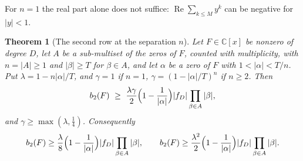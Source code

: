 \documentclass[11pt]{article}
\newtheorem{theorem}{Theorem}[section]
\begin{document}
For $n=1$ the real part alone does not suffice: $\operatorname{Re}\sum_{k\le M}y^k$
can be negative for $|y|<1$.

\begin{theorem}[The second row at the separation $n$]\label{thm:rowstwo}
Let $F\in\mathbb C[x]$ be nonzero of degree $D$, let $A$ be a sub-multiset of
the zeros of $F$, counted with multiplicity, with $n=|A|\ge1$ and
$|\beta|\ge T$ for $\beta\in A$, and let $\alpha$ be a zero of $F$ with
$1<|\alpha|<T/n$.  Put $\lambda=1-n|\alpha|/T$, and $\gamma=1$ if $n=1$,
$\gamma=(1-|\alpha|/T)^n$ if $n\ge2$.  Then
\[
  b_2(F)\ \ge\ \frac{\lambda\gamma}2\Bigl(1-\frac1{|\alpha|}\Bigr)|f_D|\prod_{\beta\in A}|\beta| ,
\]
and $\gamma\ge\max(\lambda,\frac14)$.  Consequently
\[
  b_2(F)\ge\frac\lambda8\Bigl(1-\frac1{|\alpha|}\Bigr)|f_D|
  \prod_{\beta\in A}|\beta|,
  \qquad
  b_2(F)\ge\frac{\lambda^2}2\Bigl(1-\frac1{|\alpha|}\Bigr)|f_D|
  \prod_{\beta\in A}|\beta|.
\]
\end{theorem}
\end{document}
